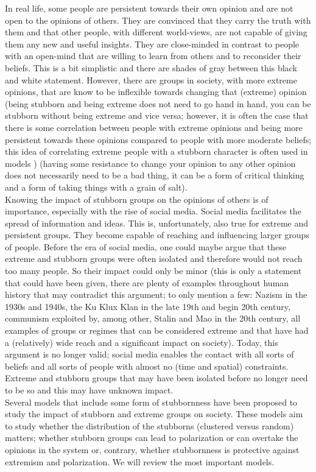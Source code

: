 \documentclass[11 pt , letterpaper , twoside , openright]{book}
\begin{document}
In real life, some people are persistent towards their own opinion and are not open to the opinions of others. They are convinced that they carry the truth with them and that other people, with different world-views, are not capable of giving them any new and useful insights. They are close-minded in contrast to people with an open-mind that are willing to learn from others and to reconsider their beliefs. This is a bit simplistic and there are shades of gray between this black and white statement. However, there are groups in society, with more extreme opinions, that are know to be inflexible towards changing that (extreme) opinion (being stubborn and being extreme does not need to go hand in hand, you can be stubborn without being extreme and vice versa; however, it is often the case that there is some correlation between people with extreme opinions and being more persistent towards these opinions compared to people with more moderate beliefs; this idea of correlating extreme people with a stubborn character is often used in models \cite{Deffuant2006}\cite{Deffuant2002}\cite{Turner}) (having some resistance to change your opinion to any other opinion does not necessarily need to be a bad thing, it can be a form of critical thinking and a form of taking things with a grain of salt).\\ 
\newline
Knowing the impact of stubborn groups on the opinions of others is of importance, especially with the rise of social media. Social media facilitates the spread of information and ideas. This is, unfortunately, also true for extreme and persistent groups. They become capable of reaching and influencing larger groups of people. Before the era of social media, one could maybe argue that these extreme and stubborn groups were often isolated and therefore would not reach too many people. So their impact could only be minor (this is only a statement that could have been given, there are plenty of examples throughout human history that may contradict this argument; to only mention a few: Nazism in the 1930s and 1940s, the Ku Klux Klan in the late 19th and begin 20th century, communism exploited by, among other, Stalin and Mao in the 20th century, all examples of groups or regimes that can be considered extreme and that have had a (relatively) wide reach and a significant impact on society). Today, this argument is no longer valid; social media enables the contact with all sorts of beliefs and all sorts of people with almost no (time and spatial) constraints. Extreme and stubborn groups that may have been isolated before no longer need to be so and this may have unknown impact. \\
\newline
Several models that include some form of stubbornness have been proposed to study the impact of stubborn and extreme groups on society. These models aim to study whether the distribution of the stubborns (clustered versus random) matters; whether stubborn groups can lead to polarization or can overtake the opinions in the system or, contrary, whether stubbornness is protective against extremism and polarization. We will review the most important models.
\end{document}
